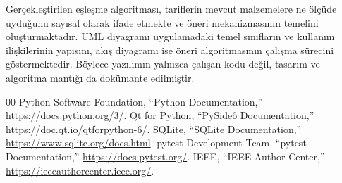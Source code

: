 \documentclass[conference]{IEEEtran}
\begin{document}
Gerçekleştirilen eşleşme algoritması, tariflerin mevcut malzemelere ne ölçüde uyduğunu sayısal olarak ifade etmekte ve öneri mekanizmasının temelini oluşturmaktadır. UML diyagramı uygulamadaki temel sınıfların ve kullanım ilişkilerinin yapısını, akış diyagramı ise öneri algoritmasının çalışma sürecini göstermektedir. Böylece yazılımın yalnızca çalışan kodu değil, tasarım ve algoritma mantığı da dokümante edilmiştir.

\begin{thebibliography}{00}
 Python Software Foundation, ``Python Documentation,'' \url{https://docs.python.org/3/}.
 Qt for Python, ``PySide6 Documentation,'' \url{https://doc.qt.io/qtforpython-6/}.
 SQLite, ``SQLite Documentation,'' \url{https://www.sqlite.org/docs.html}.
 pytest Development Team, ``pytest Documentation,'' \url{https://docs.pytest.org/}.
 IEEE, ``IEEE Author Center,'' \url{https://ieeeauthorcenter.ieee.org/}.
\end{thebibliography}
\end{document}
